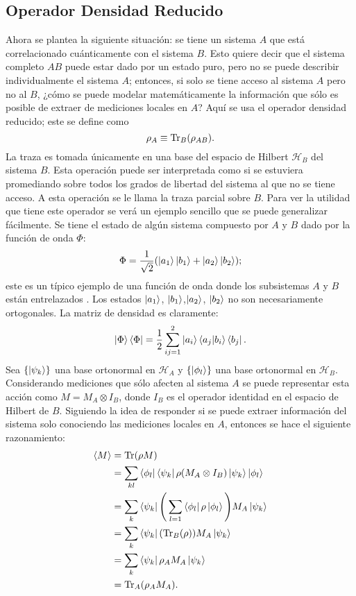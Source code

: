 \subsection{Operador Densidad Reducido}

Ahora se plantea la siguiente situación: se tiene un sistema $A$ que está correlacionado cuánticamente con el sistema $B$. Esto quiere decir que el sistema completo $AB$ puede estar dado por un estado puro, pero no se puede describir individualmente el sistema $A$; entonces, si solo se tiene acceso al sistema $A$ pero no al $B$, ¿cómo se puede modelar matemáticamente la información que sólo es posible de extraer de mediciones locales en $A$? Aquí se usa el operador densidad reducido; este se define como
\begin{equation}
\rho_{A} \equiv \Tr_{B}(\rho_{AB}).
\end{equation}
La traza es tomada únicamente en una base del espacio de Hilbert $\mathcal{H}_{B}$ del sistema $B$. Esta operación puede ser interpretada como si se estuviera promediando sobre todos los grados de libertad del sistema al que no se tiene acceso. A esta operación se le llama la traza parcial sobre $B$. Para ver la utilidad que tiene este operador se verá un ejemplo sencillo que se puede generalizar fácilmente. Se tiene el estado de algún sistema compuesto por $A$ y $B$ dado por la función de onda $\Phi$:
\begin{equation}
\Phi = \frac{1}{\sqrt{2}} (\ket{a_{1}}\ket{b_{1}}+\ket{a_{2}}\ket{b_{2}});
\end{equation}
este es un típico ejemplo de una función de onda donde los subsistemas $A$ y $B$ están entrelazados \cite{SusskindQuantum}. Los estados $\ket{a_{1}}$, $\ket{b_{1}}$,$\ket{a_{2}}$, $\ket{b_{2}}$ no son necesariamente ortogonales. La matriz de densidad es claramente:
\begin{equation}
\ket{\Phi}\bra{\Phi} = \frac{1}{2}\sum_{ij=1}^{2} \ket{a_{i}}\bra{a_{j}} \ket{b_{i}}\bra{b_{j}} .
\end{equation}
Sea $ \{ \ket{\psi_{k}} \} $ una base ortonormal en $\mathcal{H}_{A}$ y $ \{ \ket{\phi_{l}} \} $ una base ortonormal en $\mathcal{H}_{B}$. Considerando mediciones que sólo afecten al sistema $A$ se puede representar esta acción como $M=M_{A} \otimes I_{B}$, donde $I_{B}$ es el operador identidad en el espacio de Hilbert de $B$. Siguiendo la idea de responder si se puede extraer información del sistema solo conociendo las mediciones locales en $A$, entonces se hace el siguiente razonamiento:
\begin{align}
\langle M \rangle &=  \Tr(\rho M)\\
\quad &=\sum_{kl} \bra{\phi_{l}}\bra{\psi_{k}}\rho(M_{A} \otimes I_{B})\ket{\psi_{k}} \ket{\phi_{l}}\\
\quad &=\sum_{k}\bra{\psi_{k}}  \Bigg( \sum_{l=1} \bra{\phi_{l}} \rho\ket{\phi_{l}} \Bigg) M_{A}\ket{\psi_{k}}\\
\quad &=\sum_{k}\bra{\psi_{k}} ( \Tr_{B}(\rho) )  M_{A}\ket{\psi_{k}}\\
\quad &=\sum_{k}\bra{\psi_{k}} \rho_{A}  M_{A}\ket{\psi_{k}}\\
\quad &= \Tr_{A} (\rho_{A} M_{A}).
\end{align}

